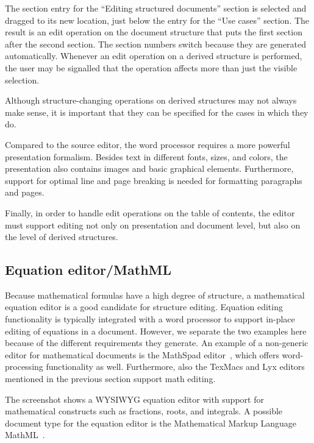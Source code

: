 The section entry for the ``Editing structured documents'' section is selected and dragged to its new location, just below the entry for the ``Use cases'' section. The result is an edit operation on the document structure that puts the first section after the second section. The section numbers switch because they are generated automatically. Whenever an edit operation on a derived structure is performed, the user may be signalled that the operation affects more than just the visible selection.

Although structure-changing operations on derived structures may not always make sense, it is important that they can be specified for the cases in which they do.
 

Compared to the source editor, the word processor requires a more powerful presentation formalism. Besides text in different fonts, sizes, and colors, the presentation also contains images and basic graphical elements. Furthermore, support for optimal line and page breaking is needed for formatting paragraphs and pages. 

Finally, in order to handle edit operations on the table of contents, the editor must support editing not only on presentation and document level, but also on the level of derived structures.


%																
\subsection{Equation editor/MathML}  

Because mathematical formulas have a high degree of structure, a mathematical equation editor is a good candidate for structure editing. Equation editing functionality is typically integrated with a word processor to support in-place editing of equations in a document. However, we separate the two examples here because of the different requirements they generate. An example of a non-generic editor for mathematical documents is the MathSpad editor~\cite{verhoeven00mathspad}, which offers word-processing functionality as well. Furthermore, also the TexMacs and Lyx editors mentioned in the previous section support math editing. 

The screenshot shows a WYSIWYG equation editor with support for mathematical constructs such as fractions, roots, and integrals. A possible document type for  the equation editor is the Mathematical Markup Language MathML~\cite{mathml20}.

